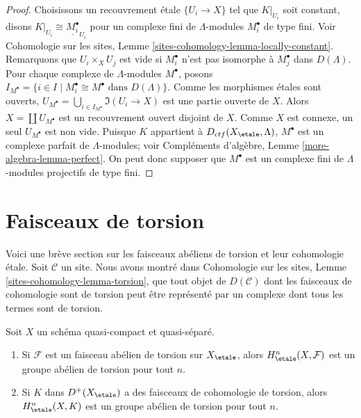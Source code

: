 \begin{proof}
Choisissons un recouvrement étale $\{U_i \to X\}$ tel que $K|_{U_i}$
soit constant, disons $K|_{U_i} \cong \underline{M_i^\bullet}_{U_i}$
pour un complexe fini de $\Lambda$-modules $M_i^\bullet$ de type fini.
Voir Cohomologie sur les sites, Lemme
\ref{sites-cohomology-lemma-locally-constant}.
Remarquons que $U_i \times_X U_j$ est vide si $M_i^\bullet$
n'est pas isomorphe à $M_j^\bullet$ dans $D(\Lambda)$.
Pour chaque complexe de $\Lambda$-modules $M^\bullet$, posons
$I_{M^\bullet} =
\{i \in I \mid M_i^\bullet \cong M^\bullet\text{ dans }D(\Lambda)\}$.
Comme les morphismes étales sont ouverts,
$U_{M^\bullet} = \bigcup_{i \in I_{M^\bullet}} \Im(U_i \to X)$
est une partie ouverte de $X$. Alors $X = \coprod U_{M^\bullet}$ est un
recouvrement ouvert disjoint de $X$. Comme $X$ est connexe, un seul $U_{M^\bullet}$
est non vide. Puisque $K$ appartient à $D_{ctf}(X_\etale, \Lambda)$, $M^\bullet$
est un complexe parfait de $\Lambda$-modules; voir
Compléments d'algèbre, Lemme \ref{more-algebra-lemma-perfect}.
On peut donc supposer que $M^\bullet$ est un complexe fini de
$\Lambda$-modules projectifs de type fini.
\end{proof}








\section{Faisceaux de torsion}
\label{section-torsion}

\noindent
Voici une brève section sur les faisceaux abéliens de torsion et leur cohomologie
étale. Soit $\mathcal{C}$ un site. Nous avons montré dans
Cohomologie sur les sites, Lemme \ref{sites-cohomology-lemma-torsion},
que tout objet de $D(\mathcal{C})$ dont les faisceaux de cohomologie sont
de torsion peut être représenté par un complexe dont tous les termes
sont de torsion.

\begin{lemma}
\label{lemma-torsion-cohomology}
Soit $X$ un schéma quasi-compact et quasi-séparé.
\begin{enumerate}
\item Si $\mathcal{F}$ est un faisceau abélien de torsion sur $X_\etale$, alors
$H^n_\etale(X, \mathcal{F})$ est un groupe abélien de torsion pour tout $n$.
\item Si $K$ dans $D^+(X_\etale)$ a des faisceaux de cohomologie de torsion, alors
$H^n_\etale(X, K)$ est un groupe abélien de torsion pour tout $n$.
\end{enumerate}
\end{lemma}

